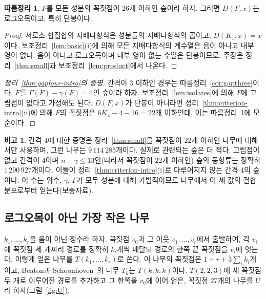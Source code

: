 \documentclass[11pt,a4paper]{article}
\theoremstyle{definition}
\newtheorem{corollary}[theorem]{따름정리}
\newtheorem{remark}[theorem]{비고}
\newcommand{\MaxLC}{26}
\begin{document}
\begin{corollary}\label{cor:smallforest}
$F$를 모든 성분의 꼭짓점이 $\MaxLC$개 이하인 숲이라 하자. 그러면 $D(F,x)$는
로그오목이고, 특히 단봉이다.
\end{corollary}

\begin{proof}
서로소 합집합의 지배다항식은 성분들의 지배다항식의 곱이고, $D(K_1,x)=x$이다.
보조정리~\ref{lem:basic}(i)에 의해 모든 지배다항식의 계수열은 음이 아니고 내부 영이
없다. 음이 아니고 로그오목이며 내부 영이 없는 수열은 단봉이므로, 주장은
정리~\ref{thm:small}과 보조정리~\ref{lem:product}에서 나온다.
\end{proof}

\begin{proof}[정리~\ref{thm:gapfour-intro}의 증명]
간격이 3 이하인 경우는 따름정리~\ref{cor:gapthree}이다. $F$를
$\Gamma(F)-\gamma(F)=4$인 숲이라 하자. 보조정리~\ref{lem:isolates}에 의해 $F$에
고립점이 없다고 가정해도 된다. $D(F,x)$가 단봉이 아니라면
정리~\ref{thm:criterion-intro}(ii)에 의해 $F$의 꼭짓점은 $6K_4-4-16=22$개 이하인데,
이는 따름정리~\ref{cor:smallforest}에 모순이다.
\end{proof}

\begin{remark}\label{rem:boundary}
간격 4에 대한 증명은 정리~\ref{thm:small}을 꼭짓점이 $22$개 이하인 나무에 대해서만
사용하며, 그런 나무는 $9\,114\,285$개이다. 실제로 관련되는 숲은 더 적다. 고립점이
없고 간격이 4이며 $n-\gamma\le13$인(따라서 꼭짓점이 $22$개 이하인) 숲의 동형류는
정확히 $1\,290\,927$개이다. 이들이 정리~\ref{thm:criterion-intro}(i)로 다루어지지 않는
간격 4의 숲이다. 이 수는 위수, $\gamma$, $\Gamma$가 모두 성분에 대해 가법적이므로
나무에서 이 세 값의 결합 분포로부터 얻는다(보충자료).
\end{remark}

\subsection{로그오목이 아닌 가장 작은 나무}

$k_1,\dots,k_r$을 음이 아닌 정수라 하자. 꼭짓점 $v_0$과 그 이웃 $v_1,\dots,v_r$에서
출발하여, 각 $v_i$에 꼭짓점 세 개짜리 경로를 정확히 $k_i$개씩 매달되 경로의 한쪽 끝
꼭짓점을 $v_i$에 잇는다. 이렇게 얻은 나무를 $T(k_1,\dots,k_r)$로 쓴다. 이 나무의
꼭짓점은 $1+r+3\sum_i k_i$개이고, Beaton과 Schoonhoven~\cite{BS}의 나무 $T_k$는
$T(k,k,k)$이다. $T(2,2,3)$에 새 꼭짓점 두 개로 이루어진 경로를 추가하고 그 한쪽을
$v_0$에 이어 얻은, 꼭짓점 $27$개의 나무를 $U$라 하자(그림~\ref{fig:U}).
\end{document}
